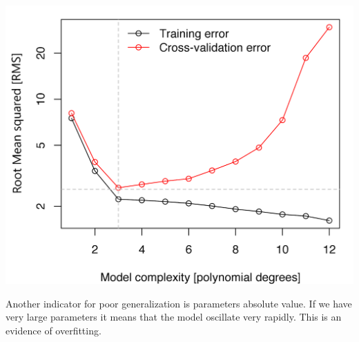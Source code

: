 \documentclass[main.tex]{subfiles}
\begin{document}
\begin{center}
    \includegraphics[scale=0.25]{img/error_complexity.png}
\end{center}

Another indicator for poor generalization is parameters absolute value. If we have very large parameters it means that the model oscillate very rapidly. This is an evidence of overfitting.
\end{document}
